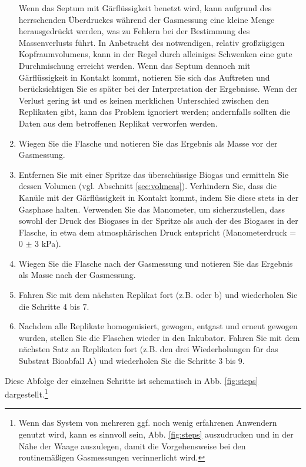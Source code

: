 \documentclass[]{article}
\begin{document}
\begin{enumerate}
{        Wenn das Septum mit Gärflüssigkeit benetzt wird, kann aufgrund des herrschenden Überdruckes während der Gasmessung eine kleine Menge herausgedrückt werden, was zu Fehlern bei der Bestimmung des Massenverlusts führt. In Anbetracht des notwendigen, relativ großzügigen Kopfraumvolumens, kann in der Regel durch alleiniges Schwenken eine gute Durchmischung erreicht werden. Wenn das Septum dennoch mit Gärflüssigkeit in Kontakt kommt, notieren Sie sich das Auftreten und berücksichtigen Sie es später bei der Interpretation der Ergebnisse.
        Wenn der Verlust gering ist und es keinen merklichen Unterschied zwischen den Replikaten gibt, kann das Problem ignoriert werden; andernfalls sollten die Daten aus dem betroffenen Replikat verworfen werden.
      }
    \item Wiegen Sie die Flasche und notieren Sie das Ergebnis als Masse vor der Gasmessung.
    \item Entfernen Sie mit einer Spritze das überschüssige Biogas und ermitteln Sie dessen Volumen (vgl. Abschnitt \ref{sec:volmeas}). Verhindern Sie, dass die Kanüle mit der Gärflüssigkeit in Kontakt kommt, indem Sie diese stets in der Gasphase halten.
      Verwenden Sie das Manometer, um sicherzustellen, dass sowohl der Druck des Biogases in der Spritze als auch der des Biogases in der Flasche, in etwa dem atmosphärischen Druck entspricht (Manometerdruck = 0 $\pm$ 3 kPa).
    \item Wiegen Sie die Flasche nach der Gasmessung und notieren Sie das Ergebnis als Masse nach der Gasmessung.
    \item Fahren Sie mit dem nächsten Replikat fort (z.B. \grqq{} oder \glqq b\grqq{}) und wiederholen Sie die Schritte 4 bis 7.
    \item Nachdem alle Replikate homogenisiert, gewogen, entgast und erneut gewogen wurden, stellen Sie die Flaschen wieder in den Inkubator.
    Fahren Sie mit dem nächsten Satz an Replikaten fort (z.B. den drei Wiederholungen für das Substrat \glqq Bioabfall A\grqq{}) und wiederholen Sie die Schritte 3 bis 9.
\end{enumerate}

Diese Abfolge der einzelnen Schritte ist schematisch in Abb. \ref{fig:steps} dargestellt.\footnote{
    Wenn das System von mehreren ggf. noch wenig erfahrenen Anwendern genutzt wird, kann es sinnvoll sein, Abb. \ref{fig:steps} auszudrucken und in der Nähe der Waage auszulegen, damit die Vorgehensweise bei den routinemäßigen Gasmessungen verinnerlicht wird.}
\end{document}
